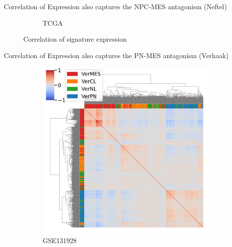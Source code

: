 \documentclass[aspectratio=169,9pt]{beamer}
\begin{document}
\begin{frame}{Correlation of Expression also captures the NPC-MES antagonism (Neftel)}
\begin{adjustwidth}{-5cm}{-5cm}
\begin{figure}
\begin{subfigure}[c]{0.48\textwidth}
                    \caption{TCGA}
                \end{subfigure}
                \caption{Correlation of signature expression}
            \end{figure}
        \end{adjustwidth}
    \end{frame}

    \begin{frame}{Correlation of Expression also captures the PN-MES antagonism (Verhaak)}
        \begin{adjustwidth}{-5cm}{-5cm}
            \centering
            \begin{figure}\ContinuedFloat
                \centering
                \begin{subfigure}[c]{0.48\textwidth}
                    \centering
                    \includegraphics[width=\textwidth]{GSM3828672_Corrplot_Ver}
                    \caption{GSE131928}
                \end{subfigure}
                \begin{subfigure}[c]{0.48\textwidth}
                    \centering

\end{subfigure}
\end{figure}
\end{adjustwidth}
\end{frame}
\end{document}
